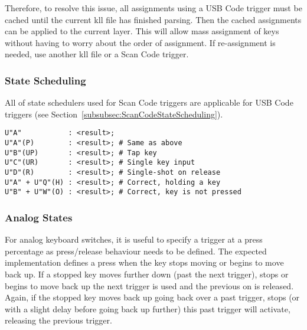 \documentclass{kiibohd-template}
\begin{document}
Therefore, to resolve this issue, all assignments using a USB Code trigger must be cached until the current kll file has finished parsing.
Then the cached assignments can be applied to the current layer.
This will allow mass assignment of keys without having to worry about the order of assignment.
If re-assignment is needed, use another kll file or a Scan Code trigger.


\subsubsection{State Scheduling}
\label{subsubsec:trigusbstateschedule}

All of state schedulers used for Scan Code triggers are applicable for USB Code triggers (see Section~\ref{subsubsec:ScanCodeStateScheduling}).

\begin{lstlisting}
U"A"           : <result>;
U"A"(P)        : <result>; # Same as above
U"B"(UP)       : <result>; # Tap key
U"C"(UR)       : <result>; # Single key input
U"D"(R)        : <result>; # Single-shot on release
U"A" + U"Q"(H) : <result>; # Correct, holding a key
U"B" + U"W"(O) : <result>; # Correct, key is not pressed
\end{lstlisting}








\subsubsection{Analog States}

For analog keyboard switches, it is useful to specify a trigger at a press percentage as press/release behaviour needs to be defined.
The expected implementation defines a press when the key stops moving or begins to move back up.
If a stopped key moves further down (past the next trigger), stops or begins to move back up the next trigger is used and the previous on is released.
Again, if the stopped key moves back up going back over a past trigger, stops (or with a slight delay before going back up further) this past trigger will activate, releasing the previous trigger.
\end{document}
